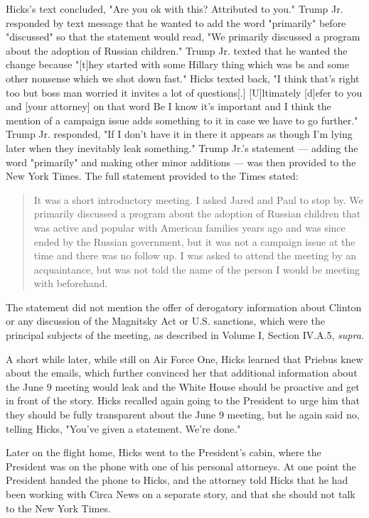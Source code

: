 Hicks's text concluded, "Are you ok with this? Attributed to you."%
Trump Jr. responded by text message that he wanted to add the word "primarily" before "discussed" so that the statement would read, "We primarily discussed a program about the adoption of Russian children."%
Trump Jr. texted that he wanted the change because "[t]hey started with some Hillary thing which was bs and some other nonsense which we shot down fast."%
Hicks texted back, "I think that's right too but boss man worried it invites a lot of questions[.]
[U]ltimately [d]efer to you and [your attorney] on that word Be I know it's important and I think the mention of a campaign issue adds something to it in case we have to go further."%
Trump Jr. responded, "If I don't have it in there it appears as though I'm lying later when they inevitably leak something."%
Trump Jr.'s statement — adding the word "primarily" and making other minor additions — was then provided to the New York Times.%
The full statement provided to the Times stated:

\begin{quote}
It was a short introductory meeting.
I asked Jared and Paul to stop by.
We primarily discussed a program about the adoption of Russian children that was active and popular with American families years ago and was since ended by the Russian government, but it was not a campaign issue at the time and there was no follow up.
I was asked to attend the meeting by an acquaintance, but was not told the name of the person I would be meeting with beforehand.%
\end{quote}

The statement did not mention the offer of derogatory information about Clinton or any discussion of the Magnitsky Act or U.S. sanctions, which were the principal subjects of the meeting, as described in Volume I, Section IV.A.5, \textit{supra}.

A short while later, while still on Air Force One, Hicks learned that Priebus knew about the emails, which further convinced her that additional information about the June 9 meeting would leak and the White House should be proactive and get in front of the story.%
Hicks recalled again going to the President to urge him that they should be fully transparent about the June 9 meeting, but he again said no, telling Hicks, "You've given a statement.
We're done."%

Later on the flight home, Hicks went to the President's cabin, where the President was on the phone with one of his personal attorneys.%
At one point the President handed the phone to Hicks, and the attorney told Hicks that he had been working with Circa News on a separate story, and that she should not talk to the New York Times.%

